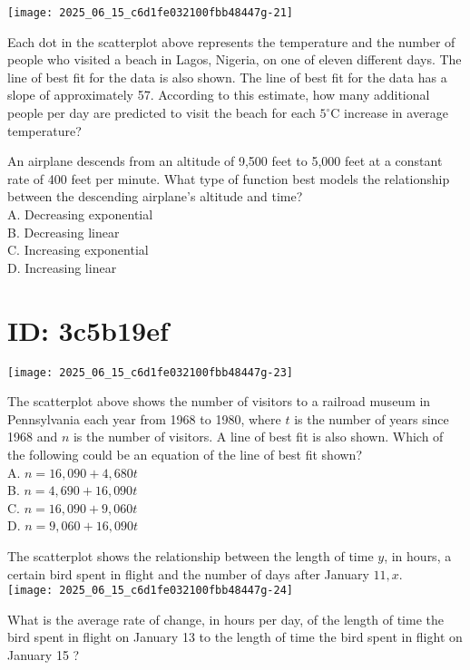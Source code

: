 





\texttt{[image: 2025\_06\_15\_c6d1fe032100fbb48447g-21]}

Each dot in the scatterplot above represents the temperature and the number of people who visited a beach in Lagos, Nigeria, on one of eleven different days. The line of best fit for the data is also shown. The line of best fit for the data has a slope of approximately 57. According to this estimate, how many additional people per day are predicted to visit the beach for each $5^{\circ} \mathrm{C}$ increase in average temperature?

An airplane descends from an altitude of 9,500 feet to 5,000 feet at a constant rate of 400 feet per minute. What type of function best models the relationship between the descending airplane's altitude and time?\\
A. Decreasing exponential\\
B. Decreasing linear\\
C. Increasing exponential\\
D. Increasing linear

\section*{ID: 3c5b19ef}
\begin{center}
\texttt{[image: 2025\_06\_15\_c6d1fe032100fbb48447g-23]}
\end{center}

The scatterplot above shows the number of visitors to a railroad museum in Pennsylvania each year from 1968 to 1980, where $t$ is the number of years since 1968 and $n$ is the number of visitors. A line of best fit is also shown. Which of the following could be an equation of the line of best fit shown?\\
A. $n=16,090+4,680 t$\\
B. $n=4,690+16,090 t$\\
C. $n=16,090+9,060 t$\\
D. $n=9,060+16,090 t$

The scatterplot shows the relationship between the length of time $y$, in hours, a certain bird spent in flight and the number of days after January $11, x$.\\
\texttt{[image: 2025\_06\_15\_c6d1fe032100fbb48447g-24]}

What is the average rate of change, in hours per day, of the length of time the bird spent in flight on January 13 to the length of time the bird spent in flight on January 15 ?

